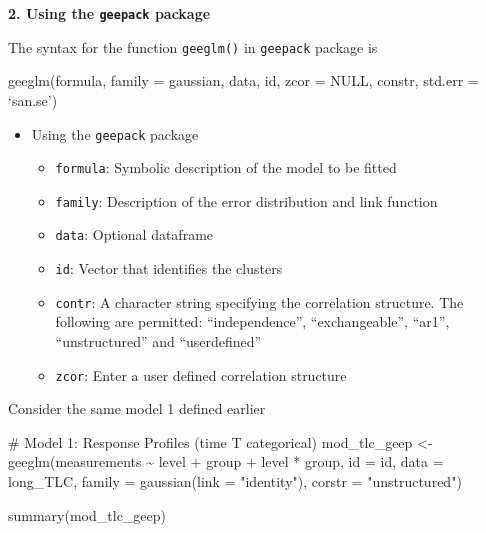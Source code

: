 \documentclass[
  letterpaper,
  DIV=11,
  numbers=noendperiod]{scrreprt}
\newenvironment{Shaded}{\begin{snugshade}}{\end{snugshade}}
\newcommand{\AttributeTok}[1]{\textcolor[rgb]{0.40,0.45,0.13}{#1}}
\newcommand{\CommentTok}[1]{\textcolor[rgb]{0.37,0.37,0.37}{#1}}
\newcommand{\FunctionTok}[1]{\textcolor[rgb]{0.28,0.35,0.67}{#1}}
\newcommand{\NormalTok}[1]{\textcolor[rgb]{0.00,0.23,0.31}{#1}}
\newcommand{\OtherTok}[1]{\textcolor[rgb]{0.00,0.23,0.31}{#1}}
\newcommand{\SpecialCharTok}[1]{\textcolor[rgb]{0.37,0.37,0.37}{#1}}
\newcommand{\StringTok}[1]{\textcolor[rgb]{0.13,0.47,0.30}{#1}}
\providecommand{\tightlist}{%
  \setlength{\itemsep}{0pt}\setlength{\parskip}{0pt}}\usepackage{longtable,booktabs,array}
\begin{document}
\textbf{2. Using the \texttt{geepack} package}

The syntax for the function \texttt{geeglm()} in \texttt{geepack}
package is

geeglm(formula, family = gaussian, data, id, zcor = NULL, constr,
std.err = `san.se')

\begin{itemize}
\tightlist
\item
  Using the \texttt{geepack} package

  \begin{itemize}
  \tightlist
  \item
    \texttt{formula}: Symbolic description of the model to be fitted
  \item
    \texttt{family}: Description of the error distribution and link
    function
  \item
    \texttt{data}: Optional dataframe
  \item
    \texttt{id}: Vector that identifies the clusters
  \item
    \texttt{contr}: A character string specifying the correlation
    structure. The following are permitted: ``independence'',
    ``exchangeable'', ``ar1'', ``unstructured'' and ``userdefined''
  \item
    \texttt{zcor}: Enter a user defined correlation structure
  \end{itemize}
\end{itemize}

Consider the same model 1 defined earlier

\begin{Shaded}
\begin{Highlighting}[]
\CommentTok{\# Model 1: Response Profiles (time T categorical)}
\NormalTok{mod\_tlc\_geep }\OtherTok{\textless{}{-}} \FunctionTok{geeglm}\NormalTok{(measurements }\SpecialCharTok{\textasciitilde{}}\NormalTok{ level }\SpecialCharTok{+}\NormalTok{ group }\SpecialCharTok{+}\NormalTok{ level }\SpecialCharTok{*}\NormalTok{ group, }\AttributeTok{id =}\NormalTok{ id, }\AttributeTok{data =}\NormalTok{ long\_TLC,}
    \AttributeTok{family =} \FunctionTok{gaussian}\NormalTok{(}\AttributeTok{link =} \StringTok{"identity"}\NormalTok{), }\AttributeTok{corstr =} \StringTok{"unstructured"}\NormalTok{)}

\FunctionTok{summary}\NormalTok{(mod\_tlc\_geep)}
\end{Highlighting}
\end{Shaded}
\end{document}

